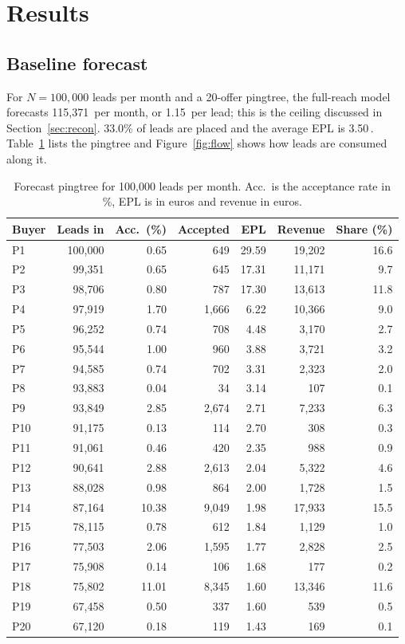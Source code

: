 \documentclass[10pt,a4paper]{article}
\begin{document}
\section{Results}
\subsection{Baseline forecast}
For $N=100{,}000$ leads per month and a 20-offer pingtree, the full-reach model forecasts 115,371\,\texteuro{} per month, or 1.15\,\texteuro{} per lead; this is the ceiling discussed in Section~\ref{sec:recon}. 33.0\% of leads are placed and the average EPL is 3.50\,\texteuro{}. Table~\ref{tab:tree} lists the pingtree and Figure~\ref{fig:flow} shows how leads are consumed along it.
\begin{table}[H]\centering\small
\caption{Forecast pingtree for 100{,}000 leads per month. Acc.\ is the acceptance rate in \%, EPL is in euros and revenue in euros.}\label{tab:tree}
\begin{tabular}{lrrrrrr}\toprule
Buyer & Leads in & Acc.\ (\%) & Accepted & EPL & Revenue & Share (\%)\\\midrule
P1 & 100,000 & 0.65 & 649 & 29.59 & 19,202 & 16.6\\
P2 & 99,351 & 0.65 & 645 & 17.31 & 11,171 & 9.7\\
P3 & 98,706 & 0.80 & 787 & 17.30 & 13,613 & 11.8\\
P4 & 97,919 & 1.70 & 1,666 & 6.22 & 10,366 & 9.0\\
P5 & 96,252 & 0.74 & 708 & 4.48 & 3,170 & 2.7\\
P6 & 95,544 & 1.00 & 960 & 3.88 & 3,721 & 3.2\\
P7 & 94,585 & 0.74 & 702 & 3.31 & 2,323 & 2.0\\
P8 & 93,883 & 0.04 & 34 & 3.14 & 107 & 0.1\\
P9 & 93,849 & 2.85 & 2,674 & 2.71 & 7,233 & 6.3\\
P10 & 91,175 & 0.13 & 114 & 2.70 & 308 & 0.3\\
P11 & 91,061 & 0.46 & 420 & 2.35 & 988 & 0.9\\
P12 & 90,641 & 2.88 & 2,613 & 2.04 & 5,322 & 4.6\\
P13 & 88,028 & 0.98 & 864 & 2.00 & 1,728 & 1.5\\
P14 & 87,164 & 10.38 & 9,049 & 1.98 & 17,933 & 15.5\\
P15 & 78,115 & 0.78 & 612 & 1.84 & 1,129 & 1.0\\
P16 & 77,503 & 2.06 & 1,595 & 1.77 & 2,828 & 2.5\\
P17 & 75,908 & 0.14 & 106 & 1.68 & 177 & 0.2\\
P18 & 75,802 & 11.01 & 8,345 & 1.60 & 13,346 & 11.6\\
P19 & 67,458 & 0.50 & 337 & 1.60 & 539 & 0.5\\
P20 & 67,120 & 0.18 & 119 & 1.43 & 169 & 0.1\\
\bottomrule\end{tabular}\end{table}
\end{document}
